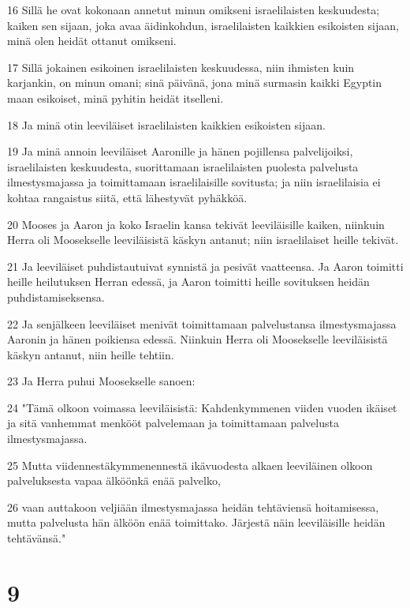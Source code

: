 \par 16 Sillä he ovat kokonaan annetut minun omikseni israelilaisten keskuudesta; kaiken sen sijaan, joka avaa äidinkohdun, israelilaisten kaikkien esikoisten sijaan, minä olen heidät ottanut omikseni.
\par 17 Sillä jokainen esikoinen israelilaisten keskuudessa, niin ihmisten kuin karjankin, on minun omani; sinä päivänä, jona minä surmasin kaikki Egyptin maan esikoiset, minä pyhitin heidät itselleni.
\par 18 Ja minä otin leeviläiset israelilaisten kaikkien esikoisten sijaan.
\par 19 Ja minä annoin leeviläiset Aaronille ja hänen pojillensa palvelijoiksi, israelilaisten keskuudesta, suorittamaan israelilaisten puolesta palvelusta ilmestysmajassa ja toimittamaan israelilaisille sovitusta; ja niin israelilaisia ei kohtaa rangaistus siitä, että lähestyvät pyhäkköä.
\par 20 Mooses ja Aaron ja koko Israelin kansa tekivät leeviläisille kaiken, niinkuin Herra oli Moosekselle leeviläisistä käskyn antanut; niin israelilaiset heille tekivät.
\par 21 Ja leeviläiset puhdistautuivat synnistä ja pesivät vaatteensa. Ja Aaron toimitti heille heilutuksen Herran edessä, ja Aaron toimitti heille sovituksen heidän puhdistamiseksensa.
\par 22 Ja senjälkeen leeviläiset menivät toimittamaan palvelustansa ilmestysmajassa Aaronin ja hänen poikiensa edessä. Niinkuin Herra oli Moosekselle leeviläisistä käskyn antanut, niin heille tehtiin.
\par 23 Ja Herra puhui Moosekselle sanoen:
\par 24 "Tämä olkoon voimassa leeviläisistä: Kahdenkymmenen viiden vuoden ikäiset ja sitä vanhemmat menkööt palvelemaan ja toimittamaan palvelusta ilmestysmajassa.
\par 25 Mutta viidennestäkymmenennestä ikävuodesta alkaen leeviläinen olkoon palveluksesta vapaa älköönkä enää palvelko,
\par 26 vaan auttakoon veljiään ilmestysmajassa heidän tehtäviensä hoitamisessa, mutta palvelusta hän älköön enää toimittako. Järjestä näin leeviläisille heidän tehtävänsä."

\chapter{9}

